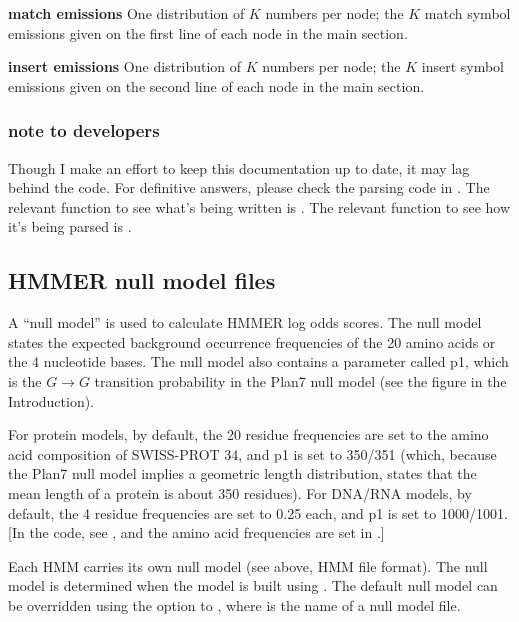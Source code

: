 \begin{wideitem}
\item [\textbf{match emissions}] One distribution of $K$ numbers
per node; the $K$ match symbol emissions given on the first line of
each node in the main section.

\item [\textbf{insert emissions}] One distribution of $K$ numbers
per node; the $K$ insert symbol emissions given on the second line of
each node in the main section.

\end{wideitem}

\subsubsection{note to developers}

Though I make an effort to keep this documentation up to date, it may
lag behind the code. For definitive answers, please check the parsing
code in . The relevant function to see what's being
written is . The relevant function to see how it's
being parsed is .

\subsection{HMMER null model files}

A ``null model'' is used to calculate HMMER log odds scores. The null
model states the expected background occurrence frequencies of the 20
amino acids or the 4 nucleotide bases. The null model also contains a
parameter called p1, which is the $G \rightarrow G$ transition
probability in the Plan7 null model (see the figure in the
Introduction).

For protein models, by default, the 20 residue frequencies are set to
the amino acid composition of SWISS-PROT 34, and p1 is set to 350/351
(which, because the Plan7 null model implies a geometric length
distribution, states that the mean length of a protein is about 350
residues). For DNA/RNA models, by default, the 4 residue frequencies
are set to 0.25 each, and p1 is set to 1000/1001.  [In the code, see
, and the amino acid frequencies are
set in .]

Each HMM carries its own null model (see above, HMM file format).  The
null model is determined when the model is built using
. The default null model can be overridden using
the  option to , where  is
the name of a null model file.  

